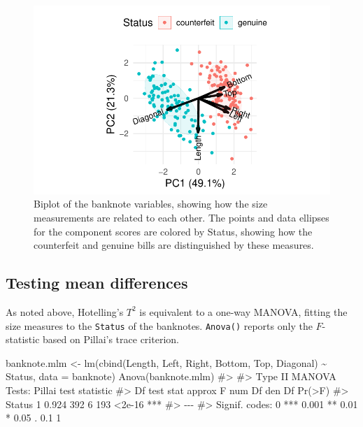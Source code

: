 \documentclass[
  letterpaper,
  10pt,
  krantz2]{krantz}
\makeatletter
\newenvironment{Shaded}{\begin{snugshade}}{\end{snugshade}}
\newcommand{\AttributeTok}[1]{\textcolor[rgb]{0.40,0.45,0.13}{#1}}
\newcommand{\CommentTok}[1]{\textcolor[rgb]{0.37,0.37,0.37}{#1}}
\newcommand{\FunctionTok}[1]{\textcolor[rgb]{0.28,0.35,0.67}{#1}}
\newcommand{\NormalTok}[1]{\textcolor[rgb]{0.00,0.23,0.31}{#1}}
\newcommand{\OtherTok}[1]{\textcolor[rgb]{0.00,0.23,0.31}{#1}}
\newcommand{\SpecialCharTok}[1]{\textcolor[rgb]{0.37,0.37,0.37}{#1}}
\newenvironment{kframe}{%
  \medskip{}
  \setlength{\fboxsep}{.8em}
  \def\at@end@of@kframe{}%
  \ifinner\ifhmode%
  \def\at@end@of@kframe{\end{minipage}}%
  \begin{minipage}{\columnwidth}%
  \fi\fi%
  \def\FrameCommand##1{\hskip\@totalleftmargin \hskip-\fboxsep
  \colorbox{shadecolor}{##1}\hskip-\fboxsep
      \hskip-\linewidth \hskip-\@totalleftmargin \hskip\columnwidth}%
  \MakeFramed {\advance\hsize-\width
    \@totalleftmargin\z@ \linewidth\hsize
    \@setminipage}}%
{\par\unskip\endMakeFramed%
  \at@end@of@kframe}
\renewenvironment{Shaded}{\begin{kframe}}{\end{kframe}}
\makeatother
\begin{document}
\begin{figure}[H]

{\centering \includegraphics[width=1\textwidth,height=\textheight]{figs/fig-banknote-biplot-1.pdf}

}

\caption{\label{fig-banknote-biplot}Biplot of the banknote variables,
showing how the size measurements are related to each other. The points
and data ellipses for the component scores are colored by Status,
showing how the counterfeit and genuine bills are distinguished by these
measures.}

\end{figure}

\hypertarget{testing-mean-differences}{%
\subsection{Testing mean differences}\label{testing-mean-differences}}

As noted above, Hotelling's \(T^2\) is equivalent to a one-way MANOVA,
fitting the size measures to the \texttt{Status} of the banknotes.
\texttt{Anova()} reports only the \(F\)-statistic based on Pillai's
trace criterion.

\begin{Shaded}
\begin{Highlighting}[]
\NormalTok{banknote.mlm }\OtherTok{\textless{}{-}} \FunctionTok{lm}\NormalTok{(}\FunctionTok{cbind}\NormalTok{(Length, Left, Right, Bottom, Top, Diagonal) }\SpecialCharTok{\textasciitilde{}}\NormalTok{ Status,}
                    \AttributeTok{data =}\NormalTok{ banknote)}
\FunctionTok{Anova}\NormalTok{(banknote.mlm)}
\CommentTok{\#\textgreater{} }
\CommentTok{\#\textgreater{} Type II MANOVA Tests: Pillai test statistic}
\CommentTok{\#\textgreater{}        Df test stat approx F num Df den Df Pr(\textgreater{}F)    }
\CommentTok{\#\textgreater{} Status  1     0.924      392      6    193 \textless{}2e{-}16 ***}
\CommentTok{\#\textgreater{} {-}{-}{-}}
\CommentTok{\#\textgreater{} Signif. codes:  0 \textquotesingle{}***\textquotesingle{} 0.001 \textquotesingle{}**\textquotesingle{} 0.01 \textquotesingle{}*\textquotesingle{} 0.05 \textquotesingle{}.\textquotesingle{} 0.1 \textquotesingle{} \textquotesingle{} 1}
\end{Highlighting}
\end{Shaded}
\end{document}
